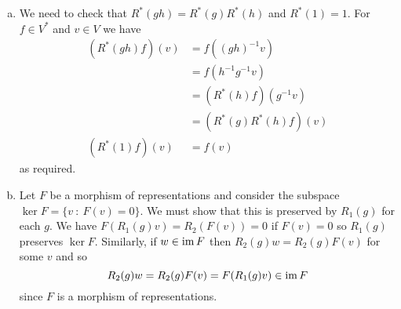 \documentclass[12pt]{article}
\begin{document}
\begin{answer}
\begin{enumerate}[(a)]
\item We need to check that $R^*(gh)=R^*(g)R^*(h)$ and $R^*(1)=1$. For $f\in V^*$ and $v\in V$ we have
\begin{align*}
(R^*(gh)f)(v)&=f((gh)^{-1}v)\\
             &=f(h^{-1}g^{-1}v)\\
             &=(R^*(h)f)(g^{-1}v)\\
             &=(R^*(g)R^*(h)f)(v)\\
(R^*(1)f)(v) &=f(v)
\end{align*}
as required.
\item Let $F$ be a morphism of representations and consider the subspace $\ker F=\{v\ :\ F(v)=0\}$. We must show that this is preserved by $R_1(g)$ for each $g$. We have $F(R_1(g)v)=R_2(F(v))=0$ if $F(v)=0$ so $R_1(g)$ preserves $\ker F$. Similarly, if $w\in\operatorname{im} F$ then $R_2(g)w=R_2(g)F(v)$ for some $v$ and so
\[R_2(g)w=R_2(g)F(v)=F(R_1(g)v)\in\operatorname{im} F\]
since $F$ is a morphism of representations.


\end{enumerate}
\end{answer}
\end{document}
